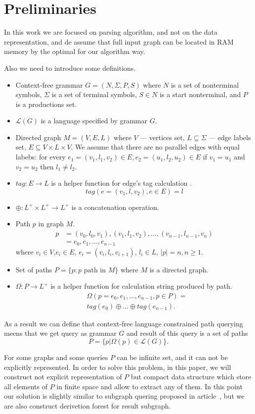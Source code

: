 \section{Preliminaries}

In this work we are focused on parsing algorithm, and not on the data representation, and de assume that full input graph can be located in RAM memory by the optimal for our algorithm way.

Also we need to introduce some definitions.
\begin{itemize}
  \item Context-free grammar $G=(N, \Sigma, P, S)$ where $N$ is a set of nonterminal symbols, $\Sigma$ is a set of terminal symbols, $S \in N$ is a start nonterminal, and $P$ is a productions set. 
  \item $\mathcal{L}(G)$ is a language specified by grammar $G$.
  \item Directed graph $M = (V,E,L)$ where $V$ --- vertices set, $L \subseteq \Sigma$ --- edge labels set, $E\subseteq V\times L\times V$. 
  We assume that there are no parallel edges with equal labebs: for every $e_1=(v_1,l_1,v_2) \in E, e_2=(u_1,l_2,u_2) \in E$ if $v_1 = u_1$ and $v_2 = u_2$ then $l_1 \neq l_2$.
  \item $tag: E \rightarrow L$ is a helper function for edge's tag calculation . $$tag(e = (v_1,l,v_2), e \in E) = l$$
  \item $\oplus: L^+ \times L^+ \rightarrow L^+$ is a concatenation operation.
  \item Path $p$ in graph $M$. 
  \begin{align*}
   p &= (v_0,l_0,v_1),(v_1,l_1,v_2),\dots,(v_{n-1},l_{n-1},v_n) \\
     &= e_0,e_1,\dots,e_{n-1}
  \end{align*}
  where $v_i \in V$,$e_i \in E$, $e_i=(v_i,l_i,v_{i+1})$, $l_i \in L$, $|p| = n, n \geq 1$. 
  \item Set of paths $P = \{p: p \text{ path in } M\}$ where $M$ is a directed graph.
  \item $\Omega: P \rightarrow L^+$ is a helper function for calculation string produced by path. 
  \begin{align*}
  & \Omega(p = e_{0},e_{1},\dots,e_{n-1}, p \in P) = \\
  & tag (e_{0}) \oplus \dots \oplus tag (e_{n-1}).
  \end{align*}
\end{itemize}

As a result we can define that context-free language constrained path querying meens that we get query as grammar $G$ and result of this query is a set of paths $$P=\{p|\Omega(p) \in \mathcal{L}(G)\}.$$

For some graphs and some queries $P$ can be infinite set, and it can not be explicitly represented. 
In order to solve this problem, in this paper, we will construct not explicit representation of $P$ but compact data structure which store all elements of $P$ in finite space and allow to extract any of them.
In this point our solution is slightly similar to subgraph quering proposed in article~\cite{GraphQueryWithEarley}, but we are also construct derivetion forest for result subgraph.
